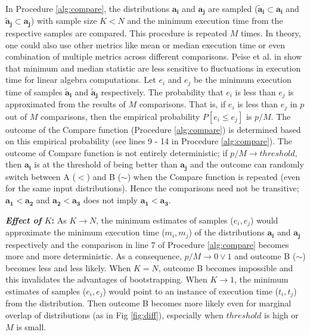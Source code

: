 \documentclass[conference]{IEEEtran}
\newcommand{\p}[1]{{\color{blue} Pdj: #1}}
\begin{document}
In Procedure \ref{alg:compare}, the distributions $\mathbf{a_i}$ and $\mathbf{a_j}$ are sampled ($\mathbf{\tilde{a}_i} \subset \mathbf{a_i}$ and $\mathbf{\tilde{a}_j} \subset \mathbf{a_j}$) with sample size $K < N $ and the minimum
execution time from the respective samples are compared. This procedure is repeated $M$ times. In theory, one could
also use other metrics like mean or median execution time or even combination of multiple metrics across different
comparisons. Peise et al. in \cite{peisethesis} show that minimum and median statistic are less sensitive to fluctuations in execution time for linear algebra computations.  Let $e_i$ and $e_j$ be the minimum execution time of samples  $\mathbf{\tilde{a}_i}$ and $\mathbf{\tilde{a}_j}$ respectively. The probability that $e_i$ is less than $e_j$ is approximated from the results of $M$ comparisons. That is, if $e_i$ is less than $e_j$ in $p$ out of $M$ comparisons, then the empirical probability $P[e_i \le e_j]$ is $p/M$. The outcome of the Compare function (Procedure \ref{alg:compare}) is determined based on this empirical probability (see lines 9 - 14 in Procedure \ref{alg:compare}). The outcome of Compare function is not entirely deterministic; if $p/M \to threshold$, then  $\mathbf{a_i}$ is at the threshold of being better than $\mathbf{a_j}$ and the outcome can randomly switch between A ($<$) and B ($\sim$) when the Compare function is repeated (even for the same input distributions). Hence the comparisons need not be transitive;  $\mathbf{a_1} < \mathbf{a_2}$ and
$\mathbf{a_2} < \mathbf{a_3} $ does not imply $\mathbf{a_1} < \mathbf{a_3}$.

\textbf{\textit{Effect of} $K$:} As $K \to N$, the minimum estimates of samples ($e_i, e_j$) would approximate the minimum execution time ($m_i, m_j$) of the distributions $\mathbf{a_i}$ and $\mathbf{a_j}$ respectively and the comparison in line 7 of Procedure \ref{alg:compare} becomes more and more deterministic. As a consequence, $p/M \to 0 \lor 1$ and outcome B ($\sim$) becomes less and less likely. When $K=N$, outcome B becomes impossible and this invalidates the advantages of bootstrapping. When $K \to 1$, the minimum estimates of samples ($e_i, e_j$) would point to an instance of execution time ($t_i, t_j$) from the distribution. Then outcome B becomes more likely even for marginal overlap of distributions (as in Fig \ref{fig:diff}), especially when $threshold$ is high or $M$ is small.
\end{document}
